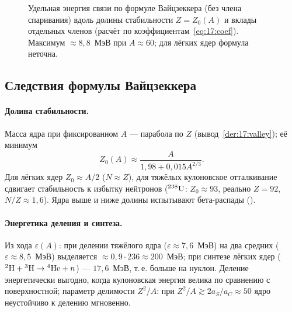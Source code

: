 \begin{figure}[htbp]
\centering
{}
\caption{Удельная энергия связи по формуле Вайцзеккера (без члена спаривания) вдоль долины стабильности $Z=Z_0(A)$
и вклады отдельных членов (расчёт по коэффициентам~\eqref{eq:17:coef}). Максимум $\approx8{,}8$~МэВ при $A\approx60$;
для лёгких ядер формула неточна.}
\label{fig:17:BA}
\end{figure}

\subsection{Следствия формулы Вайцзеккера}

\paragraph{Долина стабильности.} Масса ядра при фиксированном $A$ — парабола по $Z$ (вывод~\ref{der:17:valley}); её минимум
\begin{equation}\label{eq:17:Z0}
  Z_0(A)\approx\frac{A}{1{,}98+0{,}015A^{2/3}}.
\end{equation}
Для лёгких ядер $Z_0\approx A/2$ ($N\approx Z$), для тяжёлых кулоновское отталкивание сдвигает стабильность к избытку
нейтронов ($\nucl{U}{238}$: $Z_0\approx93$, реально $Z=92$, $N/Z\approx1{,}6$). Ядра выше и ниже долины испытывают бета-распады
().

\paragraph{Энергетика деления и синтеза.} Из хода $\varepsilon(A)$: при делении тяжёлого ядра ($\varepsilon\approx7{,}6$~МэВ) на два средних
($\varepsilon\approx8{,}5$~МэВ) выделяется $\approx0{,}9\cdot236\approx200$~МэВ; при синтезе лёгких ядер ($\nucl{H}{2}+\nucl{H}{3}\to\nucl{He}{4}+n$) —
$17{,}6$~МэВ, т.\,е. больше на нуклон. Деление энергетически выгодно, когда кулоновская энергия велика по сравнению с
поверхностной; параметр делимости $Z^2/A$: при $Z^2/A\gtrsim2a_S/a_C\approx50$ ядро неустойчиво к делению мгновенно.

